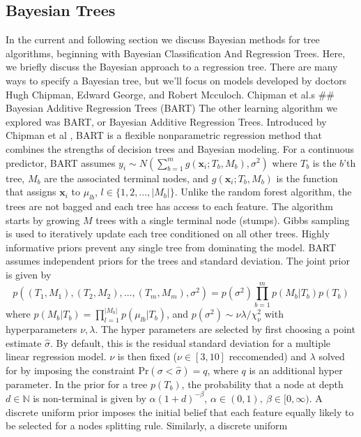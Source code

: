 \documentclass[
  12pt,
  letterpaper,
  DIV=11,
  numbers=noendperiod]{scrartcl}
\newcommand{\bm}{\mathbf}
\begin{document}
\subsection{Bayesian Trees}\label{bayesian-trees}

In the current and following section we discuss Bayesian methods for
tree algorithms, beginning with Bayesian Classification And Regression
Trees. Here, we briefly discuss the Bayesian approach to a regression
tree. There are many ways to specify a Bayesian tree, but we'll focus on
models developed by doctors Hugh Chipman, Edward George, and Robert
Mcculoch. Chipman et al.s \#\# Bayesian Additive Regression Trees (BART)
The other learning algorithm we explored was BART, or Bayesian Additive
Regression Trees. Introduced by Chipman et al \citep{bart_paper}, BART
is a flexible nonparametric regression method that combines the
strengths of decision trees and Bayesian modeling. For a continuous
predictor, BART assumes
\(y_i\sim N(\sum_{b=1}^m g(\bm x_i;T_b,M_b), \sigma^2)\) where \(T_b\)
is the \(b\)'th tree, \(M_b\) are the associated terminal nodes, and
\(g(\bm x_i;T_b,M_b)\) is the function that assigns \(\bm x_i\) to
\(\mu_{lb}\), \(l\in\{1,2,...,|M_b|\}\). Unlike the random forest
algorithm, the trees are not bagged and each tree has access to each
feature. The algorithm starts by growing \(M\) trees with a single
terminal node (stumps). Gibbs sampling is used to iteratively update
each tree conditioned on all other trees. Highly informative priors
prevent any single tree from dominating the model. BART assumes
independent priors for the trees and standard deviation. The joint prior
is given by
\[p((T_1, M_1), (T_2, M_2),...,(T_m, M_m),\sigma^2)=p(\sigma^2)\prod_{b=1}^mp(M_b|T_b)p(T_b)\]
where \(p(M_b|T_b)=\prod_{l=1}^{|M_b|}p(\mu_{lb}|T_b)\), and
\(p(\sigma^2)\sim\nu\lambda/\chi^2_\nu\) with hyperparameters
\(\nu,\lambda\). The hyper parameters are selected by first choosing a
point estimate \(\hat\sigma\). By default, this is the residual standard
deviation for a multiple linear regression model. \(\nu\) is then fixed
(\(\nu\in[3,10]\) reccomended) and \(\lambda\) solved for by imposing
the constraint \(\text{Pr}(\sigma<\hat\sigma)=q\), where \(q\) is an
additional hyper parameter. In the prior for a tree \(p(T_b)\), the
probability that a node at depth \(d\in\mathbb{N}\) is non-terminal is
given by \(\alpha(1+d)^{-\beta}\),
\(\alpha\in(0,1),\ \beta\in[0,\infty)\). A discrete uniform prior
imposes the initial belief that each feature equally likely to be
selected for a nodes splitting rule. Similarly, a discrete uniform
\end{document}
